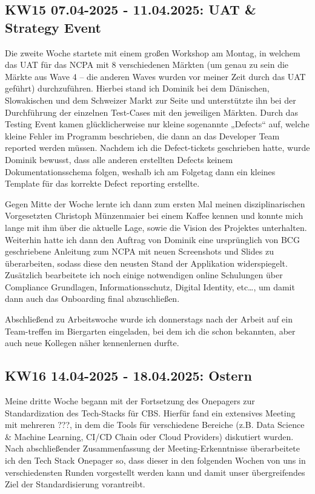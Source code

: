 \subsection{KW15 07.04-2025 - 11.04.2025: UAT \& Strategy Event}
Die zweite Woche startete mit einem großen Workshop am Montag, in welchem das \ac{UAT} für das \ac{NCPA} mit 8 verschiedenen Märkten (um genau zu sein die Märkte aus Wave 4 – die anderen Waves wurden vor meiner Zeit durch das \ac{UAT} geführt) durchzuführen. 
Hierbei stand ich Dominik bei dem Dänischen, Slowakischen und dem Schweizer Markt zur Seite und unterstützte ihn bei der Durchführung der einzelnen Test-Cases mit den jeweiligen Märkten. 
Durch das Testing Event kamen glücklicherweise nur kleine sogenannte „Defects“ auf, welche kleine Fehler im Programm beschrieben, die dann an das Developer Team reported werden müssen. 
Nachdem ich die Defect-tickets geschrieben hatte, wurde Dominik bewusst, dass alle anderen erstellten Defects keinem Dokumentationsschema folgen, weshalb ich am Folgetag dann ein kleines Template für das korrekte Defect reporting erstellte.

Gegen Mitte der Woche lernte ich dann zum ersten Mal meinen disziplinarischen Vorgesetzten Christoph Münzenmaier bei einem Kaffee kennen und konnte mich lange mit ihm über die aktuelle Lage, sowie die Vision des Projektes unterhalten. 
Weiterhin hatte ich dann den Auftrag von Dominik eine ursprünglich von BCG geschriebene Anleitung zum \ac{NCPA} mit neuen Screenshots und Slides zu überarbeiten, sodass diese den neusten Stand der Applikation widerspiegelt. 
Zusätzlich bearbeitete ich noch einige notwendigen online Schulungen über Compliance Grundlagen, Informationsschutz, Digital Identity, etc…, um damit dann auch das Onboarding final abzuschließen.

Abschließend zu Arbeitswoche wurde ich donnerstags nach der Arbeit auf ein Team-treffen im Biergarten eingeladen, bei dem ich die schon bekannten, aber auch neue Kollegen näher kennenlernen durfte.


\subsection{KW16 14.04-2025 - 18.04.2025: Ostern}
Meine dritte Woche begann mit der Fortsetzung des Onepagers zur Standardization des Tech-Stacks für \ac{CBS}. 
Hierfür fand ein extensives Meeting mit mehreren ???, in dem die Tools für verschiedene Bereiche (z.B. Data Science \& Machine Learning, CI/CD Chain oder Cloud Providers) diskutiert wurden. 
Nach abschließender Zusammenfassung der Meeting-Erkenntnisse überarbeitete ich den Tech Stack Onepager so, dass dieser in den folgenden Wochen von uns in verschiedensten Runden vorgestellt werden kann und damit unser übergreifendes Ziel der Standardisierung vorantreibt.

